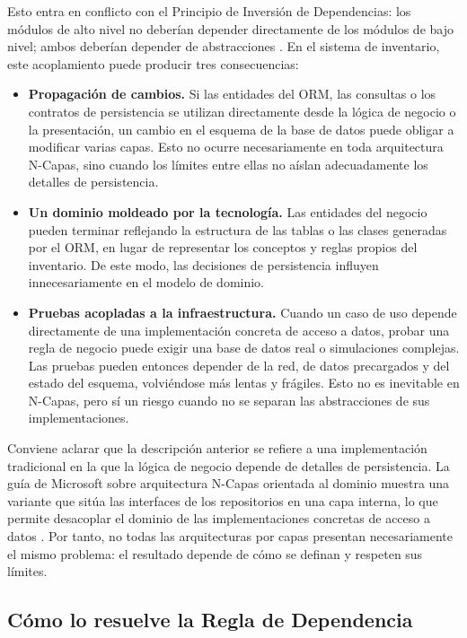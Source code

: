 Esto entra en conflicto con el Principio de Inversión de Dependencias: los módulos de alto nivel no deberían depender directamente de los módulos de bajo nivel; ambos deberían depender de abstracciones \parencite{martin2017}. En el sistema de inventario, este acoplamiento puede producir tres consecuencias:

\begin{itemize}
    \item \textbf{Propagación de cambios.} Si las entidades del ORM, las consultas o los contratos de persistencia se utilizan directamente desde la lógica de negocio o la presentación, un cambio en el esquema de la base de datos puede obligar a modificar varias capas. Esto no ocurre necesariamente en toda arquitectura N-Capas, sino cuando los límites entre ellas no aíslan adecuadamente los detalles de persistencia.

    \item \textbf{Un dominio moldeado por la tecnología.} Las entidades del negocio pueden terminar reflejando la estructura de las tablas o las clases generadas por el ORM, en lugar de representar los conceptos y reglas propios del inventario. De este modo, las decisiones de persistencia influyen innecesariamente en el modelo de dominio.

    \item \textbf{Pruebas acopladas a la infraestructura.} Cuando un caso de uso depende directamente de una implementación concreta de acceso a datos, probar una regla de negocio puede exigir una base de datos real o simulaciones complejas. Las pruebas pueden entonces depender de la red, de datos precargados y del estado del esquema, volviéndose más lentas y frágiles. Esto no es inevitable en N-Capas, pero sí un riesgo cuando no se separan las abstracciones de sus implementaciones.
\end{itemize}

Conviene aclarar que la descripción anterior se refiere a una implementación tradicional en la que la lógica de negocio depende de detalles de persistencia. La guía de Microsoft sobre arquitectura N-Capas orientada al dominio muestra una variante que sitúa las interfaces de los repositorios en una capa interna, lo que permite desacoplar el dominio de las implementaciones concretas de acceso a datos \parencite{delatorre2010}. Por tanto, no todas las arquitecturas por capas presentan necesariamente el mismo problema: el resultado depende de cómo se definan y respeten sus límites.

\subsection{Cómo lo resuelve la Regla de Dependencia}

